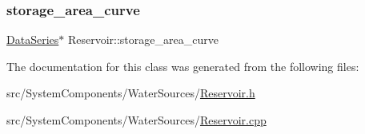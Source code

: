 \subsubsection{\texorpdfstring{storage\+\_\+area\+\_\+curve}{storage\_area\_curve}}
{\footnotesize\ttfamily \mbox{\hyperlink{classDataSeries}{Data\+Series}}$\ast$ Reservoir\+::storage\+\_\+area\+\_\+curve\hspace{0.3cm}{\ttfamily [protected]}}



The documentation for this class was generated from the following files\+:\begin{DoxyCompactItemize}
\item 
src/\+System\+Components/\+Water\+Sources/\mbox{\hyperlink{Reservoir_8h}{Reservoir.\+h}}\item 
src/\+System\+Components/\+Water\+Sources/\mbox{\hyperlink{Reservoir_8cpp}{Reservoir.\+cpp}}\end{DoxyCompactItemize}
